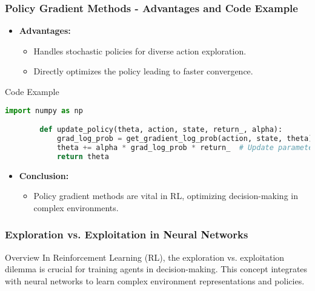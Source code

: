 \documentclass[aspectratio=169]{beamer}
\begin{document}
\begin{frame}[fragile]
    \frametitle{Policy Gradient Methods - Advantages and Code Example}
    \begin{itemize}
        \item \textbf{Advantages:}
        \begin{itemize}
            \item Handles stochastic policies for diverse action exploration.
            \item Directly optimizes the policy leading to faster convergence.
        \end{itemize}
    \end{itemize}
    \begin{block}{Code Example}
        \begin{lstlisting}[language=Python]
        import numpy as np

        def update_policy(theta, action, state, return_, alpha):
            grad_log_prob = get_gradient_log_prob(action, state, theta)  # Compute the gradient of log policy
            theta += alpha * grad_log_prob * return_  # Update parameters
            return theta
        \end{lstlisting}
    \end{block}
    \begin{itemize}
        \item \textbf{Conclusion:}
        \begin{itemize}
            \item Policy gradient methods are vital in RL, optimizing decision-making in complex environments.
        \end{itemize}
    \end{itemize}
\end{frame}

\begin{frame}[fragile]
    \frametitle{Exploration vs. Exploitation in Neural Networks}
    \begin{block}{Overview}
        In Reinforcement Learning (RL), the exploration vs. exploitation dilemma is crucial for training agents in decision-making. This concept integrates with neural networks to learn complex environment representations and policies.
    \end{block}
\end{frame}
\end{document}

